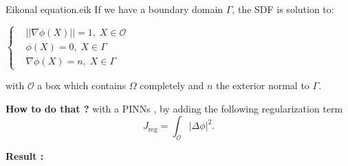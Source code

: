 {\begin{center}
\begin{minipage}{0.49\linewidth}
\begin{tcolorbox}
                \begin{mytheo}{Eikonal equation.}{eik}
                    If we have a boundary domain $\Gamma$, the SDF is solution to:
                    
                    \begin{minipage}{0.7\linewidth}
                        \hspace{350pt}
                        $\left\{\begin{aligned}
                            &||\nabla\phi(X)||=1, \; X\in\mathcal{O} \\
                            &\phi(X)=0, \; X\in\Gamma \\
                            &\nabla\phi(X)=n, \; X\in\Gamma
                        \end{aligned}\right.$
                    \end{minipage}
                    \begin{minipage}{0.25\linewidth}
                        \centering
                    \end{minipage}
                    
                    with $\mathcal{O}$ a box which contains $\Omega$ completely and $n$ the exterior normal to $\Gamma$.
                \end{mytheo}
                
                \textbf{How to do that ?} with a PINNs \cite{clemot_neural_2023}, by adding the following regularization term
                \vspace{-5pt}
                \begin{equation*}
                    J_{\text{reg}} = \int_\mathcal{O} |\Delta\phi|^2.
                \end{equation*} 
            \end{tcolorbox}
        \end{minipage}	
        \;
        \begin{minipage}{0.49\linewidth}
            \centering
            \begin{tcolorbox}[
                colback=color1!50, %
                colframe=color2, %
                arc=2mm, %
                boxrule=2pt, %
                breakable, enhanced jigsaw,
                width=\linewidth
                ]            
                \textbf{Result :} \textbf{}
                

\end{tcolorbox}
\end{minipage}
\end{center}}
